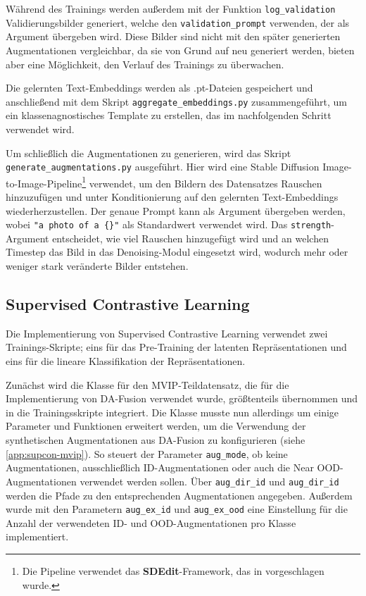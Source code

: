 Während des Trainings werden außerdem mit der Funktion \lstinline{log_validation} Validierungsbilder generiert, welche den \lstinline{validation_prompt} verwenden, der als Argument übergeben wird. Diese Bilder sind nicht mit den später generierten Augmentationen vergleichbar, da sie von Grund auf neu generiert werden, bieten aber eine Möglichkeit, den Verlauf des Trainings zu überwachen.

Die gelernten Text-Embeddings werden als .pt-Dateien gespeichert und anschließend mit dem Skript \lstinline{aggregate_embeddings.py} zusammengeführt, um ein klassenagnostisches Template zu erstellen, das im nachfolgenden Schritt verwendet wird.

Um schließlich die Augmentationen zu generieren, wird das Skript \lstinline{generate_augmentations.py} ausgeführt. Hier wird eine Stable Diffusion Image-to-Image-Pipeline\footnote{Die Pipeline verwendet das \textbf{SDEdit}-Framework, das in \parencite{Meng2022sdedit} vorgeschlagen wurde.} verwendet, um den Bildern des Datensatzes Rauschen hinzuzufügen und unter Konditionierung auf den gelernten Text-Embeddings wiederherzustellen. Der genaue Prompt kann als Argument übergeben werden, wobei \lstinline|"a photo of a {}"| als Standardwert verwendet wird. Das \lstinline{strength}-Argument entscheidet, wie viel Rauschen hinzugefügt wird und an welchen Timestep das Bild in das Denoising-Modul eingesetzt wird, wodurch mehr oder weniger stark veränderte Bilder entstehen.


\subsection{Supervised Contrastive Learning} \label{subsec:supcon-implementation}

Die Implementierung von Supervised Contrastive Learning verwendet zwei Trainings-Skripte; eins für das Pre-Training der latenten Repräsentationen und eins für die lineare Klassifikation der Repräsentationen.

Zunächst wird die Klasse für den MVIP-Teildatensatz, die für die Implementierung von DA-Fusion verwendet wurde, größtenteils übernommen und in die Trainingsskripte integriert. Die Klasse musste nun allerdings um einige Parameter und Funktionen erweitert werden, um die Verwendung der synthetischen Augmentationen aus DA-Fusion zu konfigurieren (siehe \autoref{app:supcon-mvip}). So steuert der Parameter \lstinline{aug_mode}, ob keine Augmentationen, ausschließlich ID-Augmentationen oder auch die Near OOD-Augmentationen verwendet werden sollen. Über \lstinline{aug_dir_id} und \lstinline{aug_dir_id} werden die Pfade zu den entsprechenden Augmentationen angegeben. Außerdem wurde mit den Parametern \lstinline{aug_ex_id} und \lstinline{aug_ex_ood} eine Einstellung für die Anzahl der verwendeten ID- und OOD-Augmentationen pro Klasse implementiert. %

